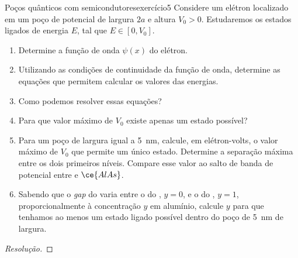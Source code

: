 \begin{exercício}{Poços quânticos com semicondutores}{exercício5}
    Considere um elétron localizado em um poço de potencial de largura \(2a\) e altura \(V_0 > 0\). Estudaremos os estados ligados de energia \(E\), tal que \(E \in [0, V_0].\)
    \begin{enumerate}[label=(\alph*)]
        \item Determine a função de onda \(\psi(x)\) do elétron.
        \item Utilizando as condições de continuidade da função de onda, determine as equações que permitem calcular os valores das energias.
        \item Como podemos resolver essas equações?
        \item Para que valor máximo de \(V_0\) existe apenas um estado possível?
        \item Para um poço de largura igual a \SI{5}{\nano\meter}, calcule, em elétron-volts, o valor máximo de \(V_0\) que permite um único estado. Determine a separação máxima entre os dois primeiros níveis. Compare esse valor ao salto de banda de potencial entre  e \(\ce{AlAs}\).
        \item Sabendo que o \textit{gap} do  varia entre o do , \(y = 0\), e o do , \(y=1\), proporcionalmente à concentração \(y\) em alumínio, calcule \(y\) para que tenhamos ao menos um estado ligado possível dentro do poço de \SI{5}{\nano\meter} de largura.
    \end{enumerate}
\end{exercício}
\begin{proof}[Resolução]

\end{proof}
